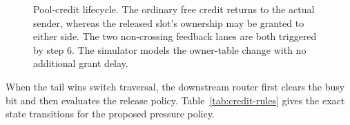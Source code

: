\documentclass[10pt,twocolumn]{article}
\begin{document}
\begin{figure}[t]
{
}
\caption{Pool-credit lifecycle. The ordinary free credit returns to the actual
sender, whereas the released slot's ownership may be granted to either side.
The two non-crossing feedback lanes are both triggered by step 6. The
simulator models the owner-table change with no additional grant delay.}
\label{fig:credit-life}
\end{figure}

When the tail wins switch traversal, the downstream router first clears the
busy bit and then evaluates the release policy. Table~\ref{tab:credit-rules}
gives the exact state transitions for the proposed pressure policy.
\end{document}
